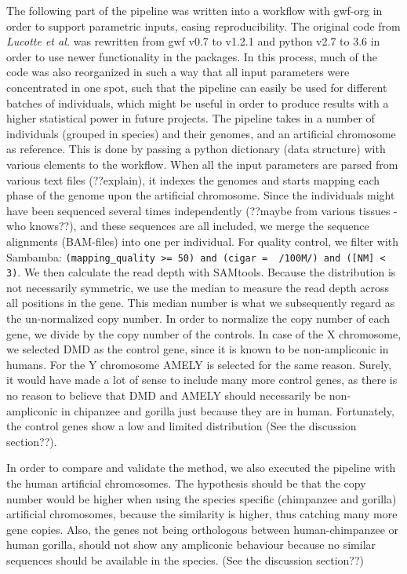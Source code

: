 \documentclass[
journal=jacsat, %
manuscript=article]{achemso}
\begin{document}
The following part of the pipeline was written into a workflow with gwf-org\cite{gwforg} in order to support parametric inputs, easing reproducibility. The original code from \textit{Lucotte et al.\cite{LucotteDyn}} was rewritten from gwf v0.7 to v1.2.1 and python v2.7 to 3.6 in order to use newer functionality in the packages. In this process, much of the code was also reorganized in such a way that all input parameters were concentrated in one spot, such that the pipeline can easily be used for different batches of individuals, which might be useful in order to produce results with a higher statistical power in future projects. The pipeline takes in a number of individuals (grouped in species) and their genomes, and an artificial chromosome as reference. This is done by passing a python dictionary (data structure) with various elements to the workflow. When all the input parameters are parsed from various text files (??explain), it indexes the genomes and starts mapping each phase of the genome upon the artificial chromosome. Since the individuals might have been sequenced several times independently (??maybe from various tissues - who knows??), and these sequences are all included, we merge the sequence alignments (BAM-files) into one per individual. For quality control, we filter with Sambamba\cite{doi:10.1093/bioinformatics/btv098}: \texttt{(mapping\_quality >= 50) and (cigar =~ /100M/) and ([NM] < 3)}. We then calculate the read depth with SAMtools\cite{Li:2009:SAF:1613280.1613286}. Because the distribution is not necessarily symmetric, we use the median to measure the read depth across all positions in the gene. This median number is what we subsequently regard as the un-normalized copy number. In order to normalize the copy number of each gene, we divide by the copy number of the controls. In case of the X chromosome, we selected DMD as the control gene, since it is known to be non-ampliconic in humans. For the Y chromosome AMELY is selected for the same reason. Surely, it would have made a lot of sense to include many more control genes, as there is no reason to believe that DMD and AMELY should necessarily be non-ampliconic in chipanzee and gorilla just because they are in human. Fortunately, the control genes show a low and limited distribution (See the discussion section??).

In order to compare and validate the method, we also executed the pipeline with the human artificial chromosomes. The hypothesis should be that the copy number would be higher when using the species specific (chimpanzee and gorilla) artificial chromosomes, because the similarity is higher, thus catching many more gene copies. Also, the genes not being orthologous between human-chimpanzee or human gorilla, should not show any ampliconic behaviour because no similar sequences should be available in the species. (See the discussion section??)
\end{document}
